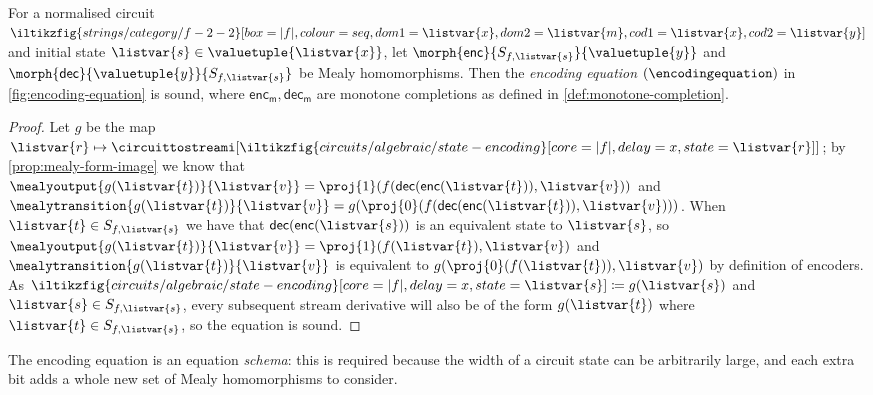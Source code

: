 \begin{proposition}\label{prop:encoding-equation}
    For a normalised circuit \(
    \iltikzfig{strings/category/f-2-2}[box=|f|,colour=seq,dom1=\listvar{x},dom2=\listvar{m},cod1=\listvar{x},cod2=\listvar{y}]
    \) and initial state \(\listvar{s} \in \valuetuple{\listvar{x}}\), let
    \(\morph{\mathsf{enc}}{S_{f,\listvar{s}}}{\valuetuple{y}}\) and
    \(\morph{\mathsf{dec}}{\valuetuple{y}}{S_{f, \listvar{s}}}\) be Mealy
    homomorphisms.
    Then the \emph{encoding equation} \((\encodingequation)\) in
    \cref{fig:encoding-equation} is sound, where
    \(\mathsf{enc}_\mathsf{m},\mathsf{dec}_\mathsf{m}\) are monotone completions
    as defined in \cref{def:monotone-completion}.
\end{proposition}
\begin{proof}
    Let \(g\) be the map \(\listvar{r} \mapsto
    \circuittostreami[\iltikzfig{circuits/algebraic/state-encoding}[core=|f|,delay=x,state=\listvar{r}]]
    \); by \cref{prop:mealy-form-image} we know that \(
    \mealyoutput{g(\listvar{t})}{\listvar{v}}
    =
    \proj{1}(f(\mathsf{dec}(\mathsf{enc}(\listvar{t})), \listvar{v}))
    \) and \(
    \mealytransition{g(\listvar{t})}{\listvar{v}}
    =
    g(\proj{0}(f(\mathsf{dec}(\mathsf{enc}(\listvar{t})), \listvar{v})))
    \).
    When \(\listvar{t} \in S_{f, \listvar{s}}\) we have that \(
    \mathsf{dec}(\mathsf{enc}(\listvar{s}))\) is an equivalent state to
    \(\listvar{s}\),
    so
    \(
    \mealyoutput{g(\listvar{t})}{\listvar{v}}
    =
    \proj{1}(f(\listvar{t}), \listvar{v})
    \) and \(
    \mealytransition{g(\listvar{t})}{\listvar{v}}
    \) is equivalent to \(
    g(\proj{0}(f(\listvar{t})), \listvar{v})
    \) by definition of encoders.
    As \(
    \iltikzfig{circuits/algebraic/state-encoding}[core=|f|,delay=x,state=\listvar{s}]
    \coloneqq
    g(\listvar{s})
    \) and \(\listvar{s} \in S_{f,\listvar{s}}\),
    every subsequent stream derivative will also be of the form
    \(g(\listvar{t})\) where \(\listvar{t} \in S_{f,\listvar{s}}\), so the
    equation is sound.
\end{proof}

\begin{remark}
    The encoding equation is an equation \emph{schema}: this is required because
    the width of a circuit state can be arbitrarily large, and each extra bit
    adds a whole new set of Mealy homomorphisms to consider.
\end{remark}



